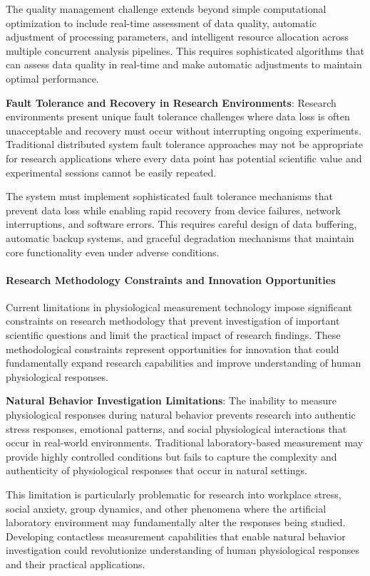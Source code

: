\documentclass[11pt,a4paper]{report}
\begin{document}
The quality management challenge extends beyond simple computational optimization to include real-time assessment of
data quality, automatic adjustment of processing parameters, and intelligent resource allocation across multiple
concurrent analysis pipelines. This requires sophisticated algorithms that can assess data quality in real-time and make
automatic adjustments to maintain optimal performance.

\textbf{Fault Tolerance and Recovery in Research Environments}: Research environments present unique fault tolerance
challenges where data loss is often unacceptable and recovery must occur without interrupting ongoing experiments.
Traditional distributed system fault tolerance approaches may not be appropriate for research applications where every
data point has potential scientific value and experimental sessions cannot be easily repeated.

The system must implement sophisticated fault tolerance mechanisms that prevent data loss while enabling rapid recovery
from device failures, network interruptions, and software errors. This requires careful design of data buffering,
automatic backup systems, and graceful degradation mechanisms that maintain core functionality even under adverse
conditions.

\paragraph{Research Methodology Constraints and Innovation Opportunities}

Current limitations in physiological measurement technology impose significant constraints on research methodology that
prevent investigation of important scientific questions and limit the practical impact of research findings. These
methodological constraints represent opportunities for innovation that could fundamentally expand research capabilities
and improve understanding of human physiological responses.

\textbf{Natural Behavior Investigation Limitations}: The inability to measure physiological responses during natural behavior
prevents research into authentic stress responses, emotional patterns, and social physiological interactions that occur
in real-world environments. Traditional laboratory-based measurement may provide highly controlled conditions but fails
to capture the complexity and authenticity of physiological responses that occur in natural settings.

This limitation is particularly problematic for research into workplace stress, social anxiety, group dynamics, and
other phenomena where the artificial laboratory environment may fundamentally alter the responses being studied.
Developing contactless measurement capabilities that enable natural behavior investigation could revolutionize
understanding of human physiological responses and their practical applications.
\end{document}
